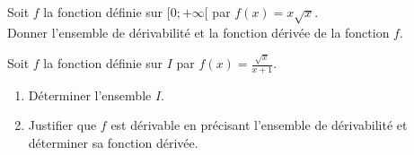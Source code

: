 \documentclass[11pt]{article}
\begin{document}
\begin{app}
  Soit $f$ la fonction définie sur $[0;+\infty[$ par $f(x)=x\sqrt x$.\\
    Donner l'ensemble de dérivabilité et la fonction dérivée de la fonction $f$.
\end{app}

\begin{app}
  Soit $f$ la fonction définie sur $I$ par $f(x)=\frac{\sqrt x}{x+1}$.
  \begin{enumerate}
    \item Déterminer l'ensemble $I$.
    \item Justifier que $f$ est dérivable en précisant l'ensemble de
      dérivabilité et déterminer sa fonction dérivée.
  \end{enumerate}
\end{app}
\end{document}
